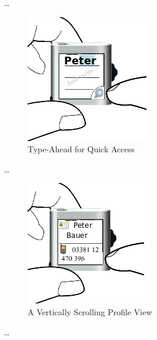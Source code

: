 %
\ldots
%
\begin{figure}[h]
  \begin{center}
    \includegraphics[width=0.6\linewidth]{imgs/wt3.png}
  \end{center}
  \caption{Type-Ahead for Quick Access}
  \label{fig:main}
\end{figure}
%
\ldots
%
\begin{figure}[h]
  \begin{center}
    \includegraphics[width=0.6\linewidth]{imgs/wt4.png}
  \end{center}
  \caption{A Vertically Scrolling Profile View}
  \label{fig:main}
\end{figure}
%
\ldots
%
